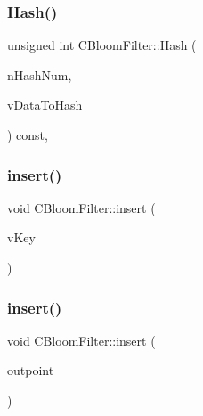 \mbox{\label{class_c_bloom_filter_a19031bd85ec49cb6f6d2cd8aa3414c75}} 
\subsubsection{\texorpdfstring{Hash()}{Hash()}}
{\footnotesize\ttfamily unsigned int C\+Bloom\+Filter\+::\+Hash (\begin{DoxyParamCaption}\item[{unsigned int}]{n\+Hash\+Num,  }\item[{const std\+::vector$<$ unsigned char $>$ \&}]{v\+Data\+To\+Hash }\end{DoxyParamCaption}) const\hspace{0.3cm}{\ttfamily [inline]}, {\ttfamily [private]}}

\mbox{\label{class_c_bloom_filter_abba52843c7c691ef7deb07d9a645dcc2}} 
\subsubsection{\texorpdfstring{insert()}{insert()}\hspace{0.1cm}{\footnotesize\ttfamily [1/3]}}
{\footnotesize\ttfamily void C\+Bloom\+Filter\+::insert (\begin{DoxyParamCaption}\item[{const std\+::vector$<$ unsigned char $>$ \&}]{v\+Key }\end{DoxyParamCaption})}

\mbox{\label{class_c_bloom_filter_aa77e023fc94fd17a0532bf17906e2146}} 
\subsubsection{\texorpdfstring{insert()}{insert()}\hspace{0.1cm}{\footnotesize\ttfamily [2/3]}}
{\footnotesize\ttfamily void C\+Bloom\+Filter\+::insert (\begin{DoxyParamCaption}\item[{const C\+Out\+Point \&}]{outpoint }\end{DoxyParamCaption})}

